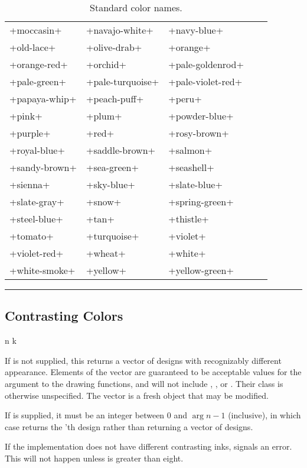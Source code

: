 \begin{table}
{\begin{tabular}{lllll}
+moccasin+ & +navajo-white+ & +navy-blue+ \\
+old-lace+ & +olive-drab+ & +orange+ \\
+orange-red+ & +orchid+ & +pale-goldenrod+ \\
+pale-green+ & +pale-turquoise+ & +pale-violet-red+ \\
+papaya-whip+ & +peach-puff+ & +peru+ \\
+pink+ & +plum+ & +powder-blue+ \\
+purple+ & +red+ & +rosy-brown+ \\
+royal-blue+ & +saddle-brown+ & +salmon+ \\
+sandy-brown+ & +sea-green+ & +seashell+ \\
+sienna+ & +sky-blue+ & +slate-blue+ \\
+slate-gray+ & +snow+ & +spring-green+ \\
+steel-blue+ & +tan+ & +thistle+ \\
+tomato+ & +turquoise+ & +violet+ \\
+violet-red+ & +wheat+ & +white+ \\
+white-smoke+ & +yellow+ & +yellow-green+ \\
\end{tabular}}
\caption{\label{color-names} Standard color names.}
\vspace{1pc}
\hrule
\end{table}


\subsection {Contrasting Colors}

 {n \optional k}

If  is not supplied, this returns a vector of  designs with
recognizably different appearance.  Elements of the vector are guaranteed to be
acceptable values for the  argument to the drawing functions, and will
not include , , or .  Their
class is otherwise unspecified.  The vector is a fresh object that may be
modified.

If  is supplied, it must be an integer between 0 and $\arg{n}-1$
(inclusive), in which case  returns the 'th
design rather than returning a vector of designs.

If the implementation does not have  different contrasting inks,
 signals an error.  This will not happen unless
 is greater than eight.


